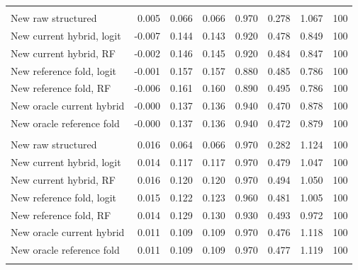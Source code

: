 {\begin{longtable}{lrrrrrrr}
\addlinespace
\multicolumn{8}{l}{\textit{$N=800$, degree $d=1$}} \\
\quad New raw structured & 0.005 & 0.066 & 0.066 & 0.970 & 0.278 & 1.067 & 100 \\
\quad New current hybrid, logit & -0.007 & 0.144 & 0.143 & 0.920 & 0.478 & 0.849 & 100 \\
\quad New current hybrid, RF & -0.002 & 0.146 & 0.145 & 0.920 & 0.484 & 0.847 & 100 \\
\quad New reference fold, logit & -0.001 & 0.157 & 0.157 & 0.880 & 0.485 & 0.786 & 100 \\
\quad New reference fold, RF & -0.006 & 0.161 & 0.160 & 0.890 & 0.495 & 0.786 & 100 \\
\quad New oracle current hybrid & -0.000 & 0.137 & 0.136 & 0.940 & 0.470 & 0.878 & 100 \\
\quad New oracle reference fold & -0.000 & 0.137 & 0.136 & 0.940 & 0.472 & 0.879 & 100 \\
\addlinespace
\multicolumn{8}{l}{\textit{$N=800$, degree $d=2$}} \\
\quad New raw structured & 0.016 & 0.064 & 0.066 & 0.970 & 0.282 & 1.124 & 100 \\
\quad New current hybrid, logit & 0.014 & 0.117 & 0.117 & 0.970 & 0.479 & 1.047 & 100 \\
\quad New current hybrid, RF & 0.016 & 0.120 & 0.120 & 0.970 & 0.494 & 1.050 & 100 \\
\quad New reference fold, logit & 0.015 & 0.122 & 0.123 & 0.960 & 0.481 & 1.005 & 100 \\
\quad New reference fold, RF & 0.014 & 0.129 & 0.130 & 0.930 & 0.493 & 0.972 & 100 \\
\quad New oracle current hybrid & 0.011 & 0.109 & 0.109 & 0.970 & 0.476 & 1.118 & 100 \\
\quad New oracle reference fold & 0.011 & 0.109 & 0.109 & 0.970 & 0.477 & 1.119 & 100 \\
\addlinespace
\end{longtable}
}
